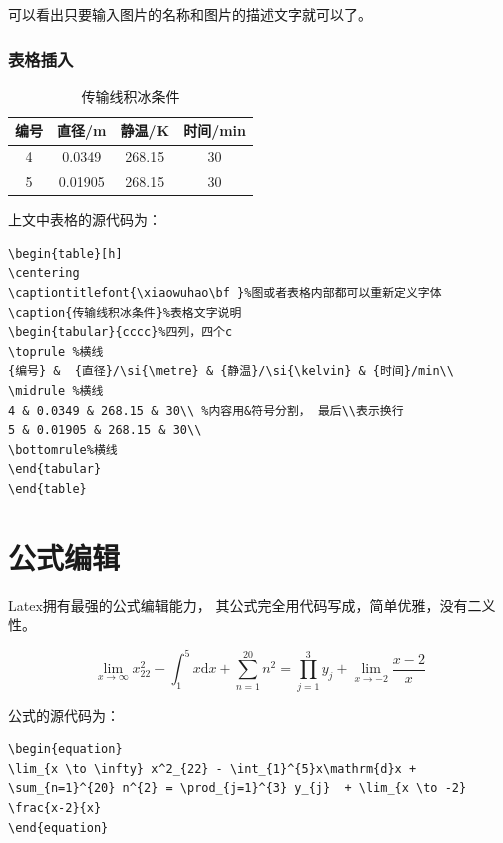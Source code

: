 \documentclass[a4paper, 10pt]{AvicReport}
\begin{document}
可以看出只要输入图片的名称和图片的描述文字就可以了。


\subsubsection{表格插入}

\begin{table}[h]
\centering
\captiontitlefont{\xiaowuhao\bf }%
\caption{传输线积冰条件}%
\begin{tabular}{cccc}%
\toprule %
{编号} &  {直径}/\si{\metre} & {静温}/\si{\kelvin} & {时间}/min\\
\midrule %
4 & 0.0349 & 268.15 & 30\\ %
5 & 0.01905 & 268.15 & 30\\
\bottomrule%
\end{tabular}
\end{table}

上文中表格的源代码为：

\begin{lstlisting}
\begin{table}[h]
\centering
\captiontitlefont{\xiaowuhao\bf }%图或者表格内部都可以重新定义字体
\caption{传输线积冰条件}%表格文字说明
\begin{tabular}{cccc}%四列，四个c
\toprule %横线
{编号} &  {直径}/\si{\metre} & {静温}/\si{\kelvin} & {时间}/min\\
\midrule %横线
4 & 0.0349 & 268.15 & 30\\ %内容用&符号分割， 最后\\表示换行
5 & 0.01905 & 268.15 & 30\\
\bottomrule%横线
\end{tabular}
\end{table}
\end{lstlisting}

\section{公式编辑}
Latex拥有最强的公式编辑能力， 其公式完全用代码写成，简单优雅，没有二义性。

\begin{equation}
\lim_{x \to \infty} x^2_{22} - \int_{1}^{5}x\mathrm{d}x + \sum_{n=1}^{20} n^{2} = \prod_{j=1}^{3} y_{j}  + \lim_{x \to -2} \frac{x-2}{x}
\end{equation}


公式的源代码为：
\begin{lstlisting}
\begin{equation}
\lim_{x \to \infty} x^2_{22} - \int_{1}^{5}x\mathrm{d}x + \sum_{n=1}^{20} n^{2} = \prod_{j=1}^{3} y_{j}  + \lim_{x \to -2} \frac{x-2}{x}
\end{equation}
\end{lstlisting}
\end{document}
